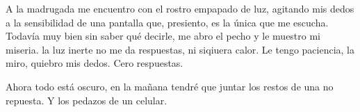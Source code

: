 
A la madrugada me encuentro con el rostro empapado de luz, agitando mis dedos
a la sensibilidad de una pantalla que, presiento, es la única que me escucha.
Todavía muy bien sin saber qué decirle, me abro el pecho y le muestro mi 
miseria. la luz inerte no me da respuestas, ni siqiuera calor. Le tengo
paciencia, la miro, quiebro mis dedos. Cero respuestas.

Ahora todo está oscuro, en la mañana tendré que juntar los restos de una no
repuesta. Y los pedazos de un celular.
